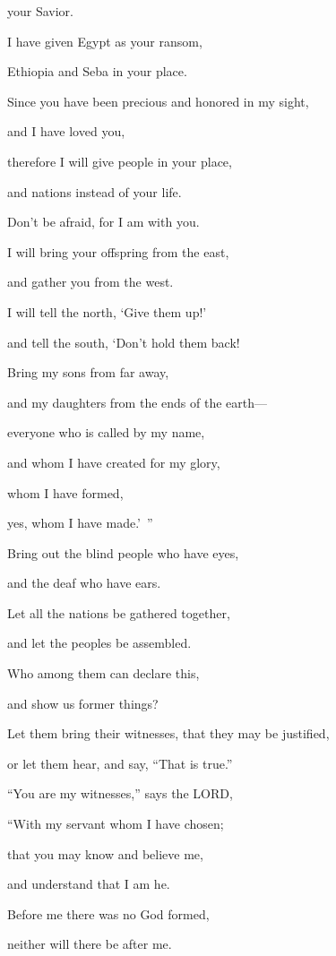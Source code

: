 your Savior.

I have given Egypt as your ransom,

Ethiopia and Seba in your place.

\myverse{}Since you have been precious and honored in my sight,

and I have loved you,

therefore I will give people in your place,

and nations instead of your life.

\myverse{}Don’t be afraid, for I am with you.

I will bring your offspring from the east,

and gather you from the west.

\myverse{}I will tell the north, ‘Give them up!’

and tell the south, ‘Don’t hold them back!

Bring my sons from far away,

and my daughters from the ends of the earth—

\myverse{}everyone who is called by my name,

and whom I have created for my glory,

whom I have formed,

yes, whom I have made.’ ”


\vspace{\baselineskip} \myverse{}Bring out the blind people who have eyes,

and the deaf who have ears.

\myverse{}Let all the nations be gathered together,

and let the peoples be assembled.

Who among them can declare this,

and show us former things?

Let them bring their witnesses, that they may be justified,

or let them hear, and say, “That is true.”


\vspace{\baselineskip} \myverse{}“You are my witnesses,” says the LORD,

“With my servant whom I have chosen;

that you may know and believe me,

and understand that I am he.

Before me there was no God formed,

neither will there be after me.

